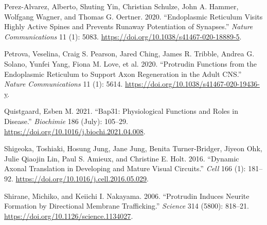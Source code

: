 \documentclass[
]{article}
\newlength{\cslhangindent}
\newlength{\cslentryspacingunit} %
\newenvironment{CSLReferences}[2] %
 {%
  \setlength{\parindent}{0pt}
  \ifodd #1
  \let\oldpar\par
  \def\par{\hangindent=\cslhangindent\oldpar}
  \fi
  \setlength{\parskip}{#2\cslentryspacingunit}
 }%
 {}
\begin{document}
\begin{CSLReferences}{1}{0}
\leavevmode{}%
Perez-Alvarez, Alberto, Shuting Yin, Christian Schulze, John A. Hammer,
Wolfgang Wagner, and Thomas G. Oertner. 2020. {``Endoplasmic Reticulum
Visits Highly Active Spines and Prevents Runaway Potentiation of
Synapses.''} \emph{Nature Communications} 11 (1): 5083.
\url{https://doi.org/10.1038/s41467-020-18889-5}.

\leavevmode{}%
Petrova, Veselina, Craig S. Pearson, Jared Ching, James R. Tribble,
Andrea G. Solano, Yunfei Yang, Fiona M. Love, et al. 2020. {``Protrudin
Functions from the Endoplasmic Reticulum to Support Axon Regeneration in
the Adult {CNS}.''} \emph{Nature Communications} 11 (1): 5614.
\url{https://doi.org/10.1038/s41467-020-19436-y}.

\leavevmode{}%
Quistgaard, Esben M. 2021. {``{Bap31}: {Physiological} Functions and
Roles in Disease.''} \emph{Biochimie} 186 (July): 105--29.
\url{https://doi.org/10.1016/j.biochi.2021.04.008}.

\leavevmode{}%
Shigeoka, Toshiaki, Hosung Jung, Jane Jung, Benita Turner-Bridger,
Jiyeon Ohk, Julie Qiaojin Lin, Paul S. Amieux, and Christine E. Holt.
2016. {``Dynamic {Axonal Translation} in {Developing} and {Mature Visual
Circuits}.''} \emph{Cell} 166 (1): 181--92.
\url{https://doi.org/10.1016/j.cell.2016.05.029}.

\leavevmode{}%
Shirane, Michiko, and Keiichi I. Nakayama. 2006. {``Protrudin {Induces
Neurite Formation} by {Directional Membrane Trafficking}.''}
\emph{Science} 314 (5800): 818--21.
\url{https://doi.org/10.1126/science.1134027}.

\end{CSLReferences}
\end{document}
